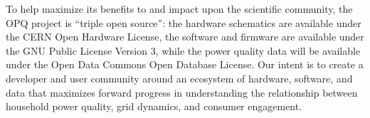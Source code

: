 To help maximize its benefits to and impact upon the scientific community, the OPQ project is ``triple open source'': the hardware schematics are available under the CERN Open Hardware License, the software and firmware are available under the GNU Public License Version 3, while the power quality data will be available under the Open Data Commons Open Database License.  Our intent is to create a developer and user community around an ecosystem of hardware, software, and data that maximizes forward progress in understanding the relationship between household power quality, grid dynamics, and consumer engagement.





 

